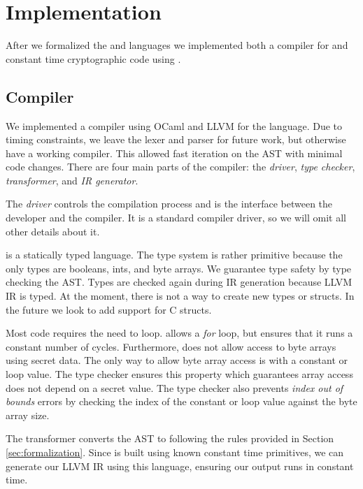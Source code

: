 \section{Implementation}
\label{sec:implementation}

After we formalized the \constc and \ccore languages we implemented both a compiler for \constc and constant time cryptographic code using \constc.

\subsection{\constc Compiler}
We implemented a compiler using OCaml and LLVM for the \constc language. Due to timing constraints, we leave the lexer and parser for future work, but otherwise have a working compiler. This allowed fast iteration on the AST with minimal code changes. There are four main parts of the \constc compiler: the \textit{driver}, \textit{type checker}, \textit{transformer}, and \textit{IR generator}.

 The \textit{driver} controls the compilation process and is the interface between the developer and the compiler. It is a standard compiler driver, so we will omit all other details about it.

 \constc is a statically typed language. The type system is rather primitive because the only types are booleans, ints, and byte arrays. We guarantee type safety by type checking the \constc AST. Types are checked again during IR generation because LLVM IR is typed. At the moment, there is not a way to create new types or structs. In the future we look to add support for C structs.

Most code requires the need to loop. \constc allows a \textit{for} loop, but ensures that it runs a constant number of cycles. Furthermore, \constc does not allow access to byte arrays using secret data. The only way to allow byte array access is with a constant or loop value. The type checker ensures this property which guarantees array access does not depend on a secret value. The type checker also prevents \textit{index out of bounds} errors by checking the index of the constant or loop value against the byte array size.

 The transformer converts the \constc AST to \ccore following the rules provided in Section \ref{sec:formalization}. Since \ccore is built using known constant time primitives, we can generate our LLVM IR using this language, ensuring our output runs in constant time.

